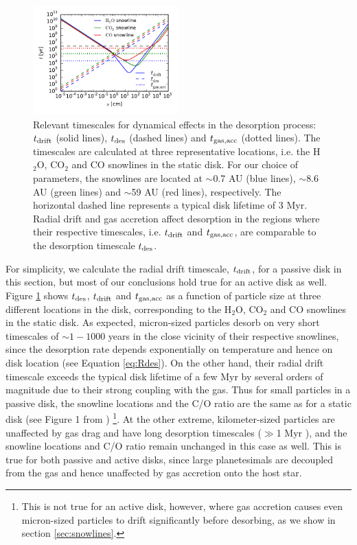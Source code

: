 \documentclass[apj]{emulateapj}
\begin{document}
\begin{figure}[h!]
\centering
\includegraphics[width=0.5\textwidth]{drift_timescales_betaS1_gas_acc_new.pdf}
\caption{Relevant timescales for dynamical effects in the desorption process: $t_{\rm drift}$ (solid lines), $t_{\rm des}$ (dashed lines) and $t_{\rm gas, acc}$ (dotted lines). The timescales are calculated at three representative locations, i.e. the H$_2$O, CO$_2$ and CO snowlines in the static disk. For our choice of parameters, the snowlines are located at $\sim$0.7 AU (blue lines), $\sim$8.6 AU (green lines) and $\sim$59 AU (red lines), respectively. The horizontal dashed line represents a typical disk lifetime of 3 Myr. Radial drift and gas accretion affect desorption in the regions where their respective timescales, i.e. $t_{\rm drift}$ and $t_{\rm gas, acc}$, are comparable to the desorption timescale $t_{\rm des}$.} 
\label{fig:timescales}
\end{figure}

For simplicity, we calculate the radial drift timescale, $t_{\rm drift}$, for a passive disk in this section, but most of our conclusions hold true for an active disk as well. Figure \ref{fig:timescales} shows $t_{\rm des}$, $t_{\rm drift}$ and $t_{\rm gas, acc}$ as a function of particle size at three different locations in the disk, corresponding to the H$_2$O, CO$_2$ and CO snowlines in the static disk. As expected, micron-sized particles desorb on very short timescales of $\sim 1-1000$ years in the close vicinity of their respective snowlines, since the desorption rate depends exponentially on temperature and hence on disk location (see Equation \ref{eq:Rdes}).  On the other hand, their radial drift timescale exceeds the typical disk lifetime of a few Myr by several orders of magnitude due to their strong coupling with the gas. Thus for small particles in a passive disk, the snowline locations and the C/O ratio are the same as for a static disk (see Figure 1 from \citealt{oberg11}) \footnote{This is not true for an active disk, however, where gas accretion causes even micron-sized particles to drift significantly before desorbing, as we show in section \ref{sec:snowlines}.}. At the other extreme, kilometer-sized particles are unaffected by gas drag and have long desorption timescales ($\gg$1 Myr ), and the snowline locations and C/O ratio remain unchanged in this case as well. This is true for both passive and active disks, since large planetesimals are decoupled from the gas and hence unaffected by gas accretion onto the host star. 
\end{document}
